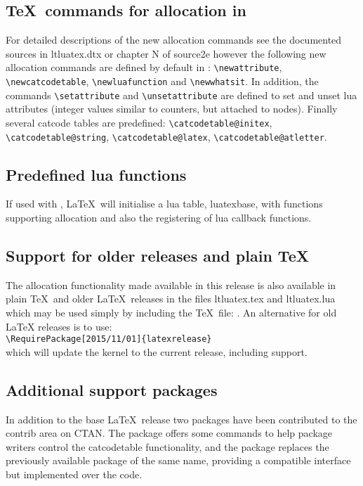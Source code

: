 \documentclass{ltnews}
\begin{document}
\subsection{\TeX\ commands for allocation in }
For detailed descriptions of the new allocation commands see the
documented sources in \textsf{ltluatex.dtx} or chapter N of
\textsf{source2e} however the following new allocation commands are
defined by default in : 
\verb|\newattribute|,
\verb|\newcatcodetable|,
\verb|\newluafunction| and
\verb|\newwhatsit|.
In addition, the commands \verb|\setattribute| and
\verb|\unsetattribute| are defined to set and unset lua attributes
(integer values similar to counters, but attached to nodes). Finally
several catcode tables are predefined: 
\verb|\catcodetable@initex|,
\verb|\catcodetable@string|,
\verb|\catcodetable@latex|,
\verb|\catcodetable@atletter|.

\subsection{Predefined lua functions}
If used with , \LaTeX\ will initialise a lua table,
\textsf{luatexbase}, with functions supporting allocation and also
the registering of lua callback functions.

\subsection{Support for older releases and plain \TeX}
The  allocation functionality made available in this
release is also available in plain \TeX\ and older \LaTeX\ releases 
in the files \textsf{ltluatex.tex} and \textsf{ltluatex.lua} which may be
used simply by including the \TeX\ file: \verb||.
An alternative for old LaTeX releases is to use:\\
\verb|\RequirePackage[2015/11/01]{latexrelease}|\\
which will update the kernel to the current release, including
 support.

\subsection{Additional  support packages}
In addition to the base \LaTeX\ release two packages have been
contributed to the \textsf{contrib} area on CTAN. The
 package offers some commands to help package
writers control the  \textsf{catcodetable}
functionality, and the  package replaces the
previously available package of the same name, providing a compatible
interface but implemented over the  code.
\end{document}
